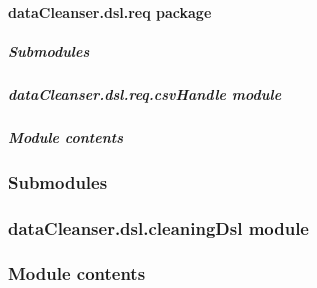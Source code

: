 \documentclass[letterpaper,10pt,english]{sphinxmanual}
\begin{document}
\paragraph{dataCleanser.dsl.req package}
\label{dataCleanser.dsl.req:datacleanser-dsl-req-package}\label{dataCleanser.dsl.req::doc}

\subparagraph{Submodules}
\label{dataCleanser.dsl.req:submodules}

\subparagraph{dataCleanser.dsl.req.csvHandle module}
\label{dataCleanser.dsl.req:module-dataCleanser.dsl.req.csvHandle}\label{dataCleanser.dsl.req:datacleanser-dsl-req-csvhandle-module}

\begin{fulllineitems}
\label{dataCleanser.dsl.req:dataCleanser.dsl.req.csvHandle.writeCSV}
\end{fulllineitems}


\begin{fulllineitems}
\label{dataCleanser.dsl.req:dataCleanser.dsl.req.csvHandle.writeDictCSV}
\end{fulllineitems}



\subparagraph{Module contents}
\label{dataCleanser.dsl.req:module-contents}\label{dataCleanser.dsl.req:module-dataCleanser.dsl.req}

\subsubsection{Submodules}
\label{dataCleanser.dsl:submodules}

\subsubsection{dataCleanser.dsl.cleaningDsl module}
\label{dataCleanser.dsl:datacleanser-dsl-cleaningdsl-module}

\subsubsection{Module contents}
\label{dataCleanser.dsl:module-contents}\label{dataCleanser.dsl:module-dataCleanser.dsl}
\end{document}
